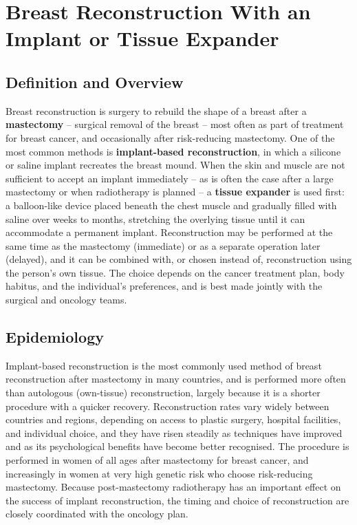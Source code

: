 \chapter{Breast Reconstruction With an Implant or Tissue Expander}

\section*{Definition and Overview}
Breast reconstruction is surgery to rebuild the shape of a breast after a \textbf{mastectomy} -- surgical removal of the breast -- most often as part of treatment for breast cancer, and occasionally after risk-reducing mastectomy. One of the most common methods is \textbf{implant-based reconstruction}, in which a silicone or saline implant recreates the breast mound. When the skin and muscle are not sufficient to accept an implant immediately -- as is often the case after a large mastectomy or when radiotherapy is planned -- a \textbf{tissue expander} is used first: a balloon-like device placed beneath the chest muscle and gradually filled with saline over weeks to months, stretching the overlying tissue until it can accommodate a permanent implant. Reconstruction may be performed at the same time as the mastectomy (immediate) or as a separate operation later (delayed), and it can be combined with, or chosen instead of, reconstruction using the person's own tissue. The choice depends on the cancer treatment plan, body habitus, and the individual's preferences, and is best made jointly with the surgical and oncology teams.

\section*{Epidemiology}
Implant-based reconstruction is the most commonly used method of breast reconstruction after mastectomy in many countries, and is performed more often than autologous (own-tissue) reconstruction, largely because it is a shorter procedure with a quicker recovery. Reconstruction rates vary widely between countries and regions, depending on access to plastic surgery, hospital facilities, and individual choice, and they have risen steadily as techniques have improved and as its psychological benefits have become better recognised. The procedure is performed in women of all ages after mastectomy for breast cancer, and increasingly in women at very high genetic risk who choose risk-reducing mastectomy. Because post-mastectomy radiotherapy has an important effect on the success of implant reconstruction, the timing and choice of reconstruction are closely coordinated with the oncology plan.

